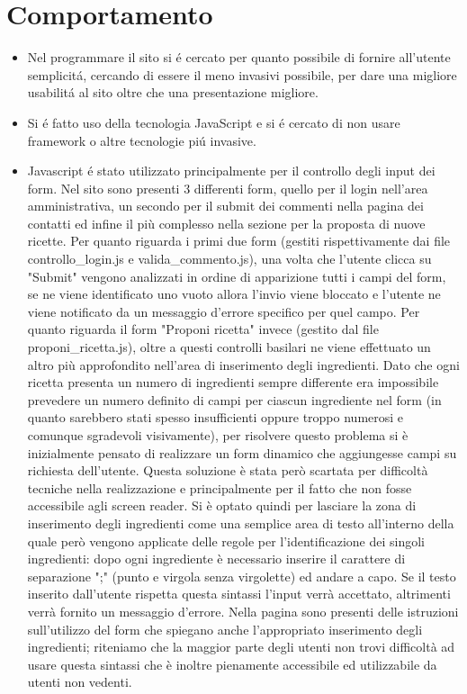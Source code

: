 \documentclass[12pt]{article}
\begin{document}
			\section{Comportamento}
			\begin{itemize}
				\item Nel programmare il sito si \'e cercato per quanto possibile di fornire all'utente semplicit\'a, cercando di essere il meno invasivi possibile, per dare una migliore usabilit\'a al sito oltre che una presentazione migliore.
				
				\item Si \'e fatto uso della tecnologia JavaScript e si \'e cercato di non usare framework o altre tecnologie pi\'u invasive.

				\item Javascript \'e stato utilizzato principalmente per il controllo degli input dei form. Nel sito sono presenti 3 differenti form, quello per il login nell'area amministrativa, un secondo per il submit dei commenti nella pagina dei contatti ed infine il più complesso nella sezione per la proposta di nuove ricette. Per quanto riguarda i primi due form (gestiti rispettivamente dai file controllo\_login.js e valida\_commento.js), una volta che l'utente clicca su "Submit" vengono analizzati in ordine di apparizione tutti i campi del form, se ne viene identificato uno vuoto allora l'invio viene bloccato e l'utente ne viene notificato da un messaggio d'errore specifico per quel campo.
				Per quanto riguarda il form "Proponi ricetta" invece (gestito dal file proponi\_ricetta.js), oltre a questi controlli basilari ne viene effettuato un altro più approfondito nell'area di inserimento degli ingredienti. Dato che ogni ricetta presenta un numero di ingredienti sempre differente era impossibile prevedere un numero definito di campi per ciascun ingrediente nel form (in quanto sarebbero stati spesso insufficienti oppure troppo numerosi e comunque sgradevoli visivamente), per risolvere questo problema si è inizialmente pensato di realizzare un form dinamico che aggiungesse campi su richiesta dell'utente. Questa soluzione è stata però scartata per difficoltà tecniche nella realizzazione e principalmente per il fatto che non fosse accessibile agli screen reader. Si è optato quindi per lasciare la zona di inserimento degli ingredienti come una semplice area di testo all'interno della quale però vengono applicate delle regole per l'identificazione dei singoli ingredienti: dopo ogni ingrediente è necessario inserire il carattere di separazione ";" (punto e virgola senza virgolette) ed andare a capo. Se il testo inserito dall'utente rispetta questa sintassi l'input verrà accettato, altrimenti verrà fornito un messaggio d'errore. Nella pagina sono presenti delle istruzioni sull'utilizzo del form che spiegano anche l'appropriato inserimento degli ingredienti; riteniamo che la maggior parte degli utenti non trovi difficoltà ad usare questa sintassi che è inoltre pienamente accessibile ed utilizzabile da utenti non vedenti.

\end{itemize}
\end{document}
